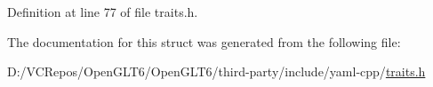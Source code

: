 Definition at line 77 of file traits.\+h.



The documentation for this struct was generated from the following file\+:\begin{DoxyCompactItemize}
\item 
D\+:/\+V\+C\+Repos/\+Open\+G\+L\+T6/\+Open\+G\+L\+T6/third-\/party/include/yaml-\/cpp/\mbox{\hyperlink{traits_8h}{traits.\+h}}\end{DoxyCompactItemize}
